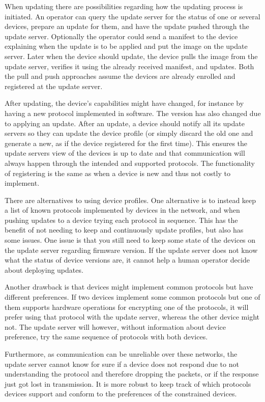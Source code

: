 \documentclass[0-thesis.tex]{subfiles}
\begin{document}
When updating there are possibilities regarding how the updating process is initiated. An
operator can query the update server for the status of one or several devices, prepare an
update for them, and have the update pushed through the update server. Optionally the
operator could send a manifest to the device explaining when the update is to be applied
and put the image on the update server. Later when the device should update, the device
pulls the image from the update server, verifies it using the already received manifest,
and updates. Both the pull and push approaches assume the devices are already enrolled and
registered at the update server.

After updating, the device's capabilities might have changed, for instance by having a new
protocol implemented in software. The version has also changed due to applying an update.
After an update, a device should notify all its update servers so they can update the
device profile (or simply discard the old one and generate a new, as if the device
registered for the first time). This ensures the update servers view of the devices is up
to date and that communication will always happen through the intended and supported
protocols. The functionality of registering is the same as when a device is new and thus
not costly to implement.

There are alternatives to using device profiles. One alternative is to instead keep a list
of known protocols implemented by devices in the network, and when pushing updates to a
device trying each protocol in sequence. This has the benefit of not needing to keep and
continuously update profiles, but also has some issues. One issue is that you still need
to keep some state of the devices on the update server regarding firmware version. If the
update server does not know what the status of device versions are, it cannot help a human
operator decide about deploying updates. 

Another drawback is that devices might implement common protocols but have different
preferences. If two devices implement some common protocols but one of them supports
hardware operations for encrypting one of the protocols, it will prefer using that
protocol with the update server, whereas the other device might not. The update server
will however, without information about device preference, try the same sequence of
protocols with both devices.

Furthermore, as communication can be unreliable over these networks, the update server
cannot know for sure if a device does not respond due to not understanding the protocol
and therefore dropping the packets, or if the response just got lost in transmission. It
is more robust to keep track of which protocols devices support and conform to the
preferences of the constrained devices.
\end{document}

